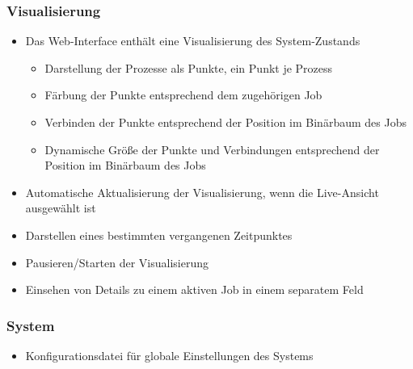     \subsubsection{Visualisierung}    
        \begin{itemize}[noitemsep]
            \item Das Web-Interface enthält eine Visualisierung des System-Zustands
                \begin{itemize}[noitemsep]
                    \item Darstellung der Prozesse als Punkte, ein Punkt je Prozess %
                    \item Färbung der Punkte entsprechend dem zugehörigen Job
                    \item Verbinden der Punkte entsprechend der Position im Binärbaum des Jobs
                    \item Dynamische Größe der Punkte und Verbindungen entsprechend der Position im Binärbaum des Jobs
                \end{itemize}
            \item Automatische Aktualisierung der Visualisierung, wenn die Live-Ansicht ausgewählt ist
            \item Darstellen eines bestimmten vergangenen Zeitpunktes
            \item Pausieren/Starten der Visualisierung
            \item Einsehen von Details zu einem aktiven Job in einem separatem Feld 
        \end{itemize}
    
    \subsubsection{System}
        \begin{itemize}[noitemsep]
            \item Konfigurationsdatei für globale Einstellungen des Systems
        \end{itemize}
        

